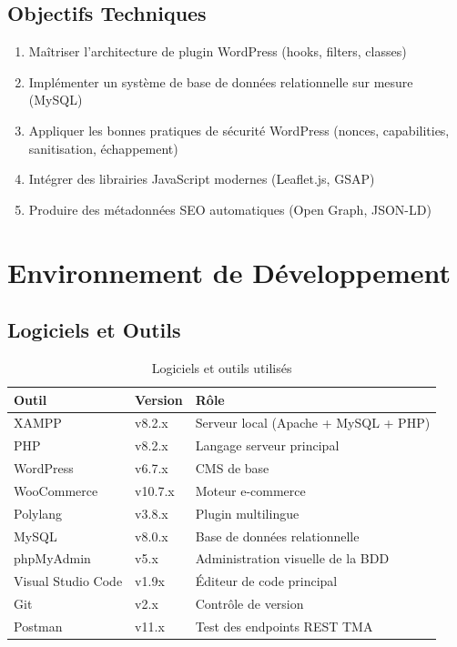 \documentclass[12pt,a4paper]{report}
\begin{document}
\section{Objectifs Techniques}

\begin{enumerate}
  \item Ma\^itriser l'architecture de plugin WordPress (hooks, filters, classes)
  \item Impl\'ementer un syst\`eme de base de donn\'ees relationnelle sur mesure (MySQL)
  \item Appliquer les bonnes pratiques de s\'ecurit\'e WordPress (nonces, capabilities,
        sanitisation, \'echappement)
  \item Int\'egrer des librairies JavaScript modernes (Leaflet.js, GSAP)
  \item Produire des m\'etadonn\'ees SEO automatiques (Open Graph, JSON-LD)
\end{enumerate}

\chapter{Environnement de D\'eveloppement}

\section{Logiciels et Outils}

\begin{table}[H]
\centering
\caption{Logiciels et outils utilis\'es}
\begin{tabularx}{\linewidth}{llX}
  \toprule
  \textbf{Outil} & \textbf{Version} & \textbf{R\^ole} \\
  \midrule
  XAMPP          & v8.2.x     & Serveur local (Apache + MySQL + PHP) \\
  PHP            & v8.2.x     & Langage serveur principal \\
  WordPress      & v6.7.x     & CMS de base \\
  WooCommerce    & v10.7.x    & Moteur e-commerce \\
  Polylang       & v3.8.x     & Plugin multilingue \\
  MySQL          & v8.0.x     & Base de donn\'ees relationnelle \\
  phpMyAdmin     & v5.x       & Administration visuelle de la BDD \\
  Visual Studio Code & v1.9x  & \'Editeur de code principal \\
  Git            & v2.x       & Contr\^ole de version \\
  Postman        & v11.x      & Test des endpoints REST TMA \\
  \bottomrule
\end{tabularx}
\end{table}
\end{document}
